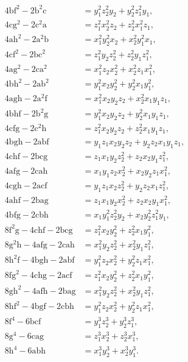 \documentclass[11pt]{article}
\begin{document}
\[\begin{aligned}
4\mathrm{bf}^2 - 2\mathrm{b}^2\mathrm{c} &= y_1^2 z_2^2 y_2 + y_2^2 z_1^2 y_1,\\
4\mathrm{cg}^2 - 2\mathrm{c}^2\mathrm{a} &= z_1^2 x_2^2 z_2 + z_2^2 x_1^2 z_1,\\
4\mathrm{ah}^2 - 2\mathrm{a}^2\mathrm{b} &= x_1^2 y_2^2 x_2 + x_2^2 y_1^2 x_1,\\
4\mathrm{cf}^2 - 2\mathrm{bc}^2 &= z_1^2 y_2 z_2^2 + z_2^2 y_1 z_1^2,\\
4\mathrm{ag}^2 - 2\mathrm{ca}^2 &= x_1^2 z_2 x_2^2 + x_2^2 z_1 x_1^2,\\
4\mathrm{bh}^2 - 2\mathrm{ab}^2 &= y_1^2 x_2 y_2^2 + y_2^2 x_1 y_1^2,\\
4\mathrm{agh} - 2\mathrm{a}^2\mathrm{f} &= x_1^2 x_2 y_2 z_2 + x_2^2 x_1 y_1 z_1,\\
4\mathrm{bhf} - 2\mathrm{b}^2\mathrm{g} &= y_1^2 x_2 y_2 z_2 + y_2^2 x_1 y_1 z_1,\\
4\mathrm{cfg} - 2\mathrm{c}^2\mathrm{h} &= z_1^2 x_2 y_2 z_2 + z_2^2 x_1 y_1 z_1,\\
4\mathrm{bgh} - 2\mathrm{abf} &= y_1 z_1 x_2 y_2 z_2 + y_2 z_2 x_1 y_1 z_1,\\
4\mathrm{chf} - 2\mathrm{bcg} &= z_1 x_1 y_2 z_2^2 + z_2 x_2 y_1 z_1^2,\\
4\mathrm{afg} - 2\mathrm{cah} &= x_1 y_1 z_2 x_2^2 + x_2 y_2 z_1 x_1^2,\\
4\mathrm{cgh} - 2\mathrm{acf} &= y_1 z_1 x_2 z_2^2 + y_2 z_2 x_1 z_1^2,\\
4\mathrm{ahf} - 2\mathrm{bag} &= z_1 x_1 y_2 x_2^2 + z_2 x_2 y_1 x_1^2,\\
4\mathrm{bfg} - 2\mathrm{cbh} &= x_1 y_1^2 z_2^2 y_2 + x_2 y_2^2 z_1^2 y_1,\\
8\mathrm{f}^2\mathrm{g} - 4\mathrm{chf} - 2\mathrm{bcg} &= z_1^2 x_2 y_2^2 + z_2^2 x_1 y_1^2,\\
8\mathrm{g}^2\mathrm{h} - 4\mathrm{afg} - 2\mathrm{cah} &= x_1^2 y_2 z_2^2 + x_2^2 y_1 z_1^2,\\
8\mathrm{h}^2\mathrm{f} - 4\mathrm{bgh} - 2\mathrm{abf} &= y_1^2 z_2 x_2^2 + y_2^2 z_1 x_1^2,\\
8\mathrm{fg}^2 - 4\mathrm{chg} - 2\mathrm{acf} &= z_1^2 x_2 y_2^2 + z_2^2 x_1 y_1^2,\\
8\mathrm{gh}^2 - 4\mathrm{afh} - 2\mathrm{bag} &= x_1^2 y_2 z_2^2 + x_2^2 y_1 z_1^2,\\
8\mathrm{hf}^2 - 4\mathrm{bgf} - 2\mathrm{cbh} &= y_1^2 z_2 x_2^2 + y_2^2 z_1 x_1^2,\\
8\mathrm{f}^4 - 6\mathrm{bcf} &= y_1^3 z_2^3 + y_2^3 z_1^3,\\
8\mathrm{g}^4 - 6\mathrm{cag} &= z_1^3 x_2^3 + z_2^3 x_1^3,\\
8\mathrm{h}^4 - 6\mathrm{abh} &= x_1^3 y_2^3 + x_2^3 y_1^3.
\end{aligned}
\]
\end{document}
